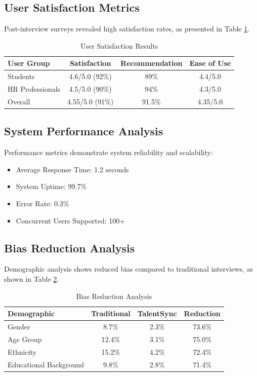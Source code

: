 \documentclass[conference]{IEEEtran}
\begin{document}
\subsection{User Satisfaction Metrics}

Post-interview surveys revealed high satisfaction rates, as presented in Table \ref{tab:satisfaction}.

\begin{table}[htbp]
\caption{User Satisfaction Results}
\begin{center}
\begin{tabular}{|l|c|c|c|}
\hline
\textbf{User Group} & \textbf{Satisfaction} & \textbf{Recommendation} & \textbf{Ease of Use} \\
\hline
Students & 4.6/5.0 (92\%) & 89\% & 4.4/5.0 \\
HR Professionals & 4.5/5.0 (90\%) & 94\% & 4.3/5.0 \\
Overall & 4.55/5.0 (91\%) & 91.5\% & 4.35/5.0 \\
\hline
\end{tabular}
\label{tab:satisfaction}
\end{center}
\end{table}

\subsection{System Performance Analysis}

Performance metrics demonstrate system reliability and scalability:
\begin{itemize}
\item Average Response Time: 1.2 seconds
\item System Uptime: 99.7\%
\item Error Rate: 0.3\%
\item Concurrent Users Supported: 100+
\end{itemize}

\subsection{Bias Reduction Analysis}

Demographic analysis shows reduced bias compared to traditional interviews, as shown in Table \ref{tab:bias}.

\begin{table}[htbp]
\caption{Bias Reduction Analysis}
\begin{center}
\begin{tabular}{|l|c|c|c|}
\hline
\textbf{Demographic} & \textbf{Traditional} & \textbf{TalentSync} & \textbf{Reduction} \\
\hline
Gender & 8.7\% & 2.3\% & 73.6\% \\
Age Group & 12.4\% & 3.1\% & 75.0\% \\
Ethnicity & 15.2\% & 4.2\% & 72.4\% \\
Educational Background & 9.8\% & 2.8\% & 71.4\% \\
\hline
\end{tabular}
\label{tab:bias}
\end{center}
\end{table}
\end{document}
